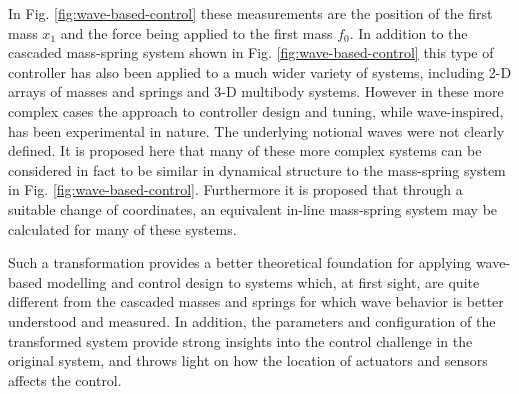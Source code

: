 \documentclass{mbd_fullpaper}
\begin{document}
In Fig. \ref{fig:wave-based-control} these measurements are the position of the first mass $x_1$ and the force being applied to the first mass $f_0$.
In addition to the cascaded mass-spring system shown in Fig. \ref{fig:wave-based-control} this type of controller has also been applied to a much wider variety of systems, including 2-D arrays of masses and springs and 3-D multibody systems. However in these more complex cases the approach to controller design and tuning, while wave-inspired, has been experimental in nature.
The underlying notional waves were not clearly defined.
It is proposed here that many of these more complex systems can be considered in fact to be similar in dynamical structure to the mass-spring system in Fig. \ref{fig:wave-based-control}.
Furthermore it is proposed that through a suitable change of coordinates, an equivalent in-line mass-spring system may be calculated for many of these systems.

Such a transformation provides a better theoretical foundation for applying wave-based modelling and control design to systems which, at first sight, are quite different from the cascaded masses and springs for which wave behavior is better understood and measured.
In addition, the parameters and configuration of the transformed system provide strong insights into the control challenge in the original system, and throws light on how the location of actuators and sensors affects the control.
\end{document}
